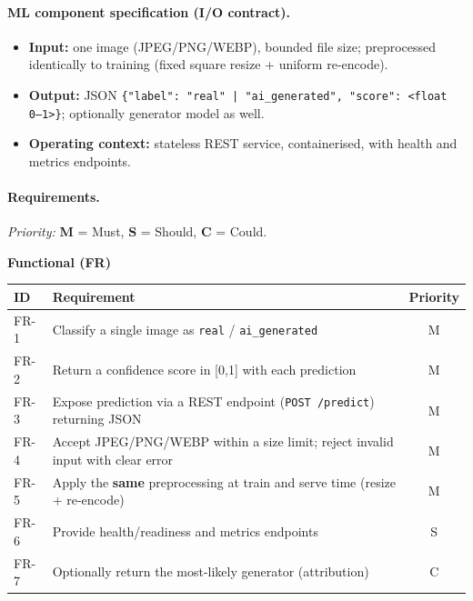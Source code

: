 \documentclass[11pt]{article}
\begin{document}
\paragraph{ML component specification (I/O contract).}
\begin{itemize}[nosep,leftmargin=1.4em]

\medskip

  \item \textbf{Input:} one image (JPEG/PNG/WEBP), bounded file size; preprocessed identically to training (fixed square resize + uniform re-encode).

\medskip

  \item \textbf{Output:} JSON \texttt{\{"label": "real" | "ai\_generated", "score": <float 0--1>\}}; optionally generator model as well.

\medskip

  \item \textbf{Operating context:} stateless REST service, containerised, with health and metrics endpoints.
\end{itemize}

\paragraph{Requirements.}



\textit{Priority:} \textbf{M} = Must, \textbf{S} = Should, \textbf{C} = Could.

\medskip\noindent\textbf{Functional (FR)}\par\smallskip
\noindent\begin{tabularx}{\textwidth}{@{}l Y c@{}}
\toprule
\textbf{ID} & \textbf{Requirement} & \textbf{Priority} \\
\midrule
FR-1 & Classify a single image as \texttt{real} / \texttt{ai\_generated} & M \\
FR-2 & Return a confidence score in [0,1] with each prediction & M \\
FR-3 & Expose prediction via a REST endpoint (\texttt{POST /predict}) returning JSON & M \\
FR-4 & Accept JPEG/PNG/WEBP within a size limit; reject invalid input with clear error & M \\
FR-5 & Apply the \textbf{same} preprocessing at train and serve time (resize + re-encode) & M \\
FR-6 & Provide health/readiness and metrics endpoints & S \\
FR-7 & Optionally return the most-likely generator (attribution) & C \\
\bottomrule


\end{tabularx}
\end{document}
